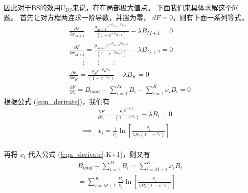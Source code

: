 因此对于BS的效用$U_{BS}$来说，存在局部极大值点。
下面我们来具体求解这个问题。
首先让对方程两连求一阶导数，并置为零，
$dF = 0$，则有下面一系列等式。
\begin{subequations}
\label{eqn_derivate}
\begin{align} &\frac{\partial F}{\partial x_{M+1}} =
\frac{\rho_{M+1} e^{-\rho_{M+1} x_{M+1}}}{(1-e^{-\rho_{M+1}})} - \lambda B_{M+1} = 0 \tag{\theequation -M+1}\\
&\frac{\partial F}{\partial x_{M+2}} =
\frac{\rho_{M+2} e^{-\rho_{M+2} x_{M+2}}}{(1-e^{-\rho_{M+2}})} - \lambda B_{M+2} = 0 \tag{\theequation -M+2}\\
\nonumber & \qquad \vdots \qquad \vdots \qquad \vdots \\
&\frac{\partial F}{\partial x_K} =
\frac{\rho_K e^{-\rho_K x_K}}{(1-e^{-\rho_K})} - \lambda B_K = 0 \tag{\theequation -K}\\
&\frac{\partial F}{\partial \lambda} = B_{total} - \sum_{i=1}^M B_i -
\sum^K_{i=1}x_iB_i = 0 \tag{\theequation -K+1}
\end{align}
\end{subequations}
根据公式 (\ref{eqn_derivate})，我们有
\begin{equation*}
\begin{split}
&\frac{\partial F}{\partial x_i} = \frac{\rho_i e^{-\rho_i
x_i}}{(1-e^{-\rho_i})} - \lambda B_i = 0\\
\implies &x_i = \frac{1}{\rho_i} \ln \left[ \frac{\rho_i}{\lambda B_i(1-e^{-\rho_i})} \right] \\
\end{split}
\end{equation*}

再将 $x_i$ 代入公式 (\ref{eqn_derivate}-K+1)，则又有
%
\begin{equation}
\begin{split}
&B_{total} -\sum_{i=1}^MB_i = \sum_{i=M+1}^K x_i B_i \\
&= \sum_{i=M+1}^K \frac{B_i}{\rho_i} \ln \left[ \frac{\rho_i}{\lambda B_i(1-e^{-\rho_i})} \right] \\
\end{split}
\label{eqn_find_mu}
\end{equation}

